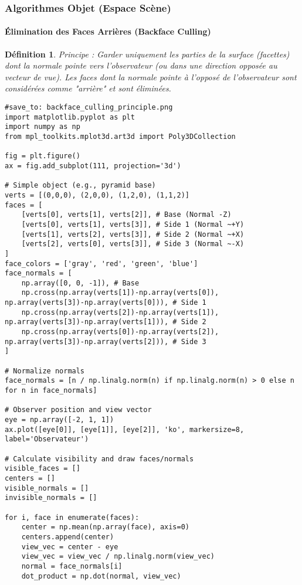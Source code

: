 \documentclass{article}
\newtheorem{definition}{Définition}
\begin{document}
{\subsubsection{Algorithmes Objet (Espace Scène)}

\paragraph{Élimination des Faces Arrières (Backface Culling)}
\begin{definition}
Principe : Garder uniquement les parties de la surface (facettes) dont la normale pointe \textit{vers} l'observateur (ou dans une direction opposée au vecteur de vue). Les faces dont la normale pointe à l'opposé de l'observateur sont considérées comme "arrière" et sont éliminées.
\end{definition}

\begin{verbatim}
#save_to: backface_culling_principle.png
import matplotlib.pyplot as plt
import numpy as np
from mpl_toolkits.mplot3d.art3d import Poly3DCollection

fig = plt.figure()
ax = fig.add_subplot(111, projection='3d')

# Simple object (e.g., pyramid base)
verts = [(0,0,0), (2,0,0), (1,2,0), (1,1,2)]
faces = [
    [verts[0], verts[1], verts[2]], # Base (Normal -Z)
    [verts[0], verts[1], verts[3]], # Side 1 (Normal ~+Y)
    [verts[1], verts[2], verts[3]], # Side 2 (Normal ~+X)
    [verts[2], verts[0], verts[3]], # Side 3 (Normal ~-X)
]
face_colors = ['gray', 'red', 'green', 'blue']
face_normals = [
    np.array([0, 0, -1]), # Base
    np.cross(np.array(verts[1])-np.array(verts[0]), np.array(verts[3])-np.array(verts[0])), # Side 1
    np.cross(np.array(verts[2])-np.array(verts[1]), np.array(verts[3])-np.array(verts[1])), # Side 2
    np.cross(np.array(verts[0])-np.array(verts[2]), np.array(verts[3])-np.array(verts[2])), # Side 3
]

# Normalize normals
face_normals = [n / np.linalg.norm(n) if np.linalg.norm(n) > 0 else n for n in face_normals]

# Observer position and view vector
eye = np.array([-2, 1, 1])
ax.plot([eye[0]], [eye[1]], [eye[2]], 'ko', markersize=8, label='Observateur')

# Calculate visibility and draw faces/normals
visible_faces = []
centers = []
visible_normals = []
invisible_normals = []

for i, face in enumerate(faces):
    center = np.mean(np.array(face), axis=0)
    centers.append(center)
    view_vec = center - eye
    view_vec = view_vec / np.linalg.norm(view_vec)
    normal = face_normals[i]
    dot_product = np.dot(normal, view_vec)


\end{verbatim}}
\end{document}
